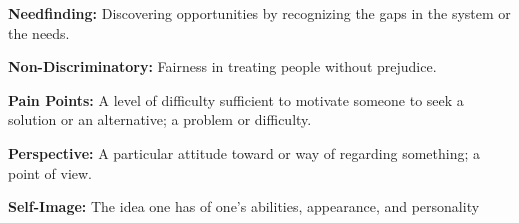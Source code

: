   \item \textbf{Needfinding:} Discovering opportunities by recognizing the gaps in the system or the needs.
  \item \textbf{Non-Discriminatory:} Fairness in treating people without prejudice.
  \item \textbf{Pain Points:} A level of difficulty sufficient to motivate someone to seek a solution or an alternative; a problem or difficulty.
  \item \textbf{Perspective:} A particular attitude toward or way of regarding something; a point of view.
  \item \textbf{Self-Image:} The idea one has of one's abilities, appearance, and personality
